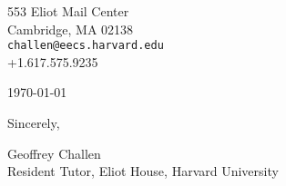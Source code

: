 

\def\shorttitle{Short Title}
\def\shortauthors{Geoffrey Challen}


\pagestyle{letter}

553 Eliot Mail Center\\
Cambridge, MA 02138\\
\texttt{challen@eecs.harvard.edu}\\
+1.617.575.9235

\vspace*{0.1in}

\today

\vspace*{0.1in}



\vspace*{0.1in}

Sincerely,

\vspace*{0.5in}

Geoffrey Challen\\
Resident Tutor, Eliot House, Harvard University


